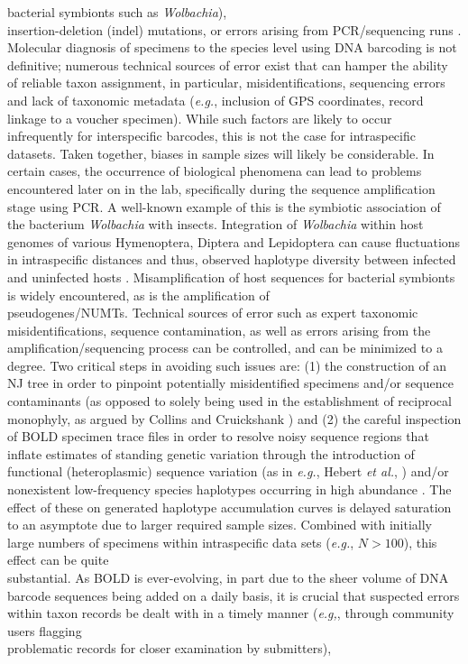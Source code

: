 bacterial symbionts such as \textit{Wolbachia}), \\ insertion-deletion (indel) mutations, or errors arising from PCR/sequencing runs \cite{goodall2012comparison}. \\ Molecular diagnosis of specimens to the species level using DNA barcoding is not \\ definitive; numerous technical sources of error exist that can hamper the ability of reliable taxon assignment, in particular, misidentifications, sequencing errors and lack of taxonomic metadata (\textit{e.g.}, inclusion of GPS coordinates, record linkage to a voucher specimen). While such factors are likely to occur infrequently for interspecific barcodes, this is not the case for intraspecific datasets. Taken together, biases in sample sizes  will likely be considerable. In certain cases, the occurrence of biological phenomena can lead to problems encountered later on in the lab, specifically during the sequence amplification stage using PCR. A well-known example of this is the symbiotic association of the bacterium \textit{Wolbachia} with insects. Integration of \textit{Wolbachia} within host genomes of various Hymenoptera, Diptera and Lepidoptera can cause fluctuations in intraspecific distances \cite{smith2012wolbachia} and thus, observed haplotype diversity between infected and uninfected hosts \cite{chen2017effects}. Misamplification of host sequences for bacterial symbionts is widely encountered, as is the amplification of \\ pseudogenes/NUMTs. Technical sources of error such as expert taxonomic \\ misidentifications, sequence contamination, as well as errors arising from the \\ amplification/sequencing process can be controlled, and can be minimized to a degree. Two critical steps in avoiding such issues are: (1) the construction of an NJ tree in order to pinpoint potentially misidentified specimens and/or sequence contaminants (as opposed to solely being used in the establishment of reciprocal monophyly, as argued by Collins and Cruickshank \cite{collins2013seven}) and (2) the careful inspection of BOLD specimen trace files in order to resolve noisy sequence regions that inflate estimates of standing genetic variation through the introduction of functional (heteroplasmic) sequence variation (as in \textit{e.g.}, Hebert \textit{et al.}, \cite{hebert2004ten}) and/or nonexistent low-frequency species haplotypes occurring in high abundance \cite{stoeckle2012frequency}. The effect of these on generated haplotype accumulation curves is delayed saturation to an asymptote due to larger required sample sizes. Combined with initially large numbers of specimens within intraspecific data sets (\textit{e.g.}, $N > 100$), this effect can be quite \\ substantial. As BOLD is ever-evolving, in part due to the sheer volume of DNA barcode sequences being added on a daily basis, it is crucial that suspected errors within taxon records be dealt with in a timely manner (\textit{e.g,}, through community users flagging \\ problematic records for closer examination by submitters), 